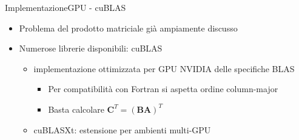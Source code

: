 \documentclass{beamer}
\begin{document}
\begin{frame}{Implementazione}{GPU - cuBLAS}
    \begin{itemize}
        \item Problema del prodotto matriciale già ampiamente discusso
        \item Numerose librerie disponibili: \alert{cuBLAS}
              \begin{itemize}
                  \item implementazione ottimizzata per GPU NVIDIA delle specifiche BLAS
                        \begin{itemize}
                            \item Per compatibilità con Fortran si aspetta ordine column-major
                            \item Basta calcolare $\mathbf{C}^T=(\mathbf{B}\mathbf{A})^T$
                        \end{itemize}
                  \item \alert{cuBLASXt}: estensione per ambienti multi-GPU
              \end{itemize}
    \end{itemize}
\end{frame}
\end{document}
